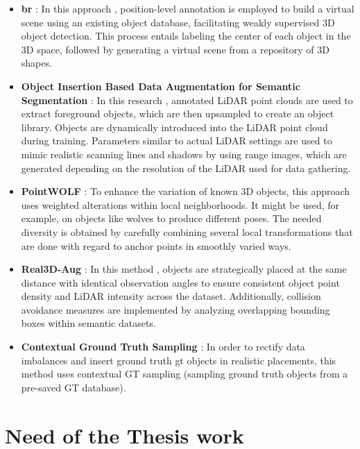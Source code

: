 \begin{itemize}
    \item \textbf{\acrfull{br}} : In this approach \parencite{xu2022reality}, position-level annotation is employed to build a virtual scene using an existing object database, facilitating weakly supervised 3D object detection. This process entails labeling the center of each object in the 3D space, followed by generating a virtual scene from a repository of 3D shapes.
    \item \textbf{Object Insertion Based Data Augmentation for Semantic Segmentation} : In this research \parencite{9811816}, annotated LiDAR point clouds are used to extract foreground objects, which are then upsampled to create an object library. Objects are dynamically introduced into the LiDAR point cloud during training. Parameters similar to actual LiDAR settings are used to mimic realistic scanning lines and shadows by using range images, which are generated depending on the resolution of the LiDAR used for data gathering.
    \item \textbf{PointWOLF} : To enhance the variation of known 3D objects, this approach \parencite{pointwolf_2021} uses weighted alterations within local neighborhoods. It might be used, for example, on objects like wolves to produce different poses. The needed diversity is obtained by carefully combining several local transformations that are done with regard to anchor points in smoothly varied ways.
    \item \textbf{Real3D-Aug} : In this method \parencite{sebek2022real3daug}, objects are strategically placed at the same distance with identical observation angles to ensure consistent object point density and LiDAR intensity across the dataset. Additionally, collision avoidance measures are implemented by analyzing overlapping bounding boxes within semantic datasets.
    \item \textbf{Contextual Ground Truth Sampling} : In order to rectify data imbalances and insert ground truth \acrshort{gt} objects in realistic placements, this method \parencite{lee2022resolving} uses contextual GT sampling (sampling ground truth objects from a pre-saved GT database).
\end{itemize}

\section{Need of the Thesis work}

